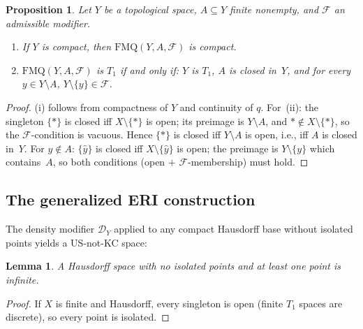 \documentclass[11pt]{article}
\newtheorem{lemma}[theorem]{Lemma}
\newtheorem{proposition}[theorem]{Proposition}
\theoremstyle{definition}
\theoremstyle{remark}
\begin{document}
\begin{proposition}\label{prop:fmq-basic}
Let $Y$ be a topological space, $A \subseteq Y$ finite nonempty, and
$\mathcal{F}$ an admissible modifier.
\begin{enumerate}[label=\textup{(\roman*)},nosep]
\item If $Y$ is compact, then $\mathrm{FMQ}(Y, A, \mathcal{F})$ is compact.
\item $\mathrm{FMQ}(Y, A, \mathcal{F})$ is $T_1$ if and only if: $Y$ is $T_1$,
  $A$ is closed in~$Y$, and for every
  $y \in Y \setminus A$, $Y \setminus \{y\} \in \mathcal{F}$.
\end{enumerate}
\end{proposition}

\begin{proof}
(i) follows from compactness of $Y$ and continuity of $q$.
For~(ii): the singleton $\{\ast\}$ is closed iff
$X \setminus \{\ast\}$ is open; its preimage is $Y \setminus A$,
and $\ast \notin X \setminus \{\ast\}$, so the $\mathcal{F}$-condition
is vacuous.  Hence $\{\ast\}$ is closed iff $Y \setminus A$ is open,
i.e., iff $A$ is closed in~$Y$.
For $y \notin A$: $\{\hat{y}\}$ is closed iff $X \setminus \{\hat{y}\}$ is open; the preimage is $Y \setminus \{y\}$ which contains~$A$, so both conditions
(open $+$ $\mathcal{F}$-membership) must hold.
\end{proof}

\subsection{The generalized ERI construction}

The density modifier $\mathcal{D}_Y$ applied to any compact Hausdorff
base without isolated points yields a US-not-KC space:

\begin{lemma}\label{lem:infinite}
A Hausdorff space with no isolated points and at least one point is
infinite.
\end{lemma}

\begin{proof}
If $X$ is finite and Hausdorff, every singleton is open (finite $T_1$
spaces are discrete), so every point is isolated.
\end{proof}
\end{document}
